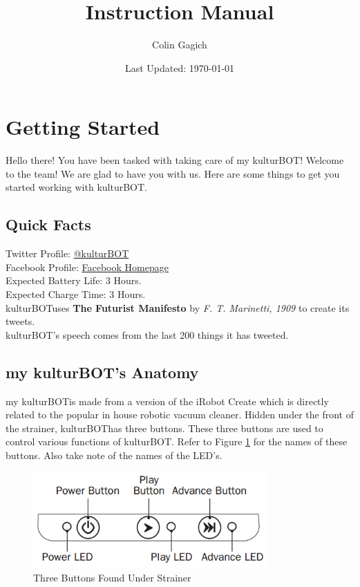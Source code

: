 \documentclass[]{article}
\title{\kbspace Instruction Manual}
\author{Colin Gagich}
\date{Last Updated: \today}
\newcommand{\kb}{kulturBOT}
\newcommand{\kbspace}{\kb \space}
\newcommand{\mykb}{my \kb}
\newcommand{\mykbspace}{\mykb \space}
\begin{document}
\maketitle

\newpage

\tableofcontents
\newpage

\section{Getting Started}
Hello there! You have been tasked with taking care of \mykb! Welcome to the team! We are glad to have you with us. Here are some things to get you started working with \kb.

\subsection{Quick Facts}

Twitter Profile: \href{https://twitter.com/kulturBOT}{@kulturBOT} \\
Facebook Profile: \href{https://www.facebook.com/thekulturbot}{Facebook Homepage}\\
Expected Battery Life: 3 Hours.\\
Expected Charge Time: 3 Hours.\\
\kbspace uses \textbf{The Futurist Manifesto} by \textit{F. T. Marinetti, 1909} to create its tweets.\\
\kb 's speech comes from the last 200 things it has tweeted.

\subsection{\mykb 's Anatomy}

\mykbspace is made from a version of the iRobot Create which is directly related to the popular in house robotic vacuum cleaner. Hidden under the front of the strainer, \kbspace has three buttons. These three buttons are used to control various functions of \kb. Refer to Figure \ref{3button} for the names of these buttons. Also take note of the names of the LED's.

	\begin{figure}[h!]
		\centering
	    \includegraphics[width=0.8\textwidth]{img/3button.png}
	    \caption{Three Buttons Found Under Strainer}
	    \label{3button}
	\end{figure}
\end{document}
